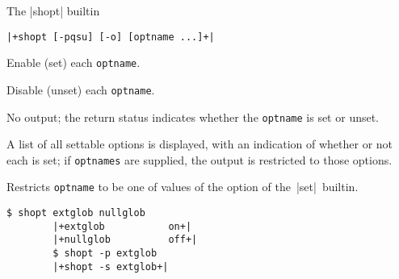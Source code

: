 \begin{frame}[fragile]{The \bash|shopt| builtin}{}
    \vspace{-2mm}
    \begin{lstlisting}[style=myBash, numbers=none]
        |+shopt [-pqsu] [-o] [optname ...]+|
    \end{lstlisting}
    \vspace{2mm}
    \begin{description}
        \item[\PB{\texttt{-s}}]
            Enable (set) each \texttt{optname}.
        \item[\PB{\texttt{-s}}]
            Disable (unset) each \texttt{optname}.
        \item[\PB{\texttt{-q}}]
            No output; the return status indicates whether the \texttt{optname} is set or unset.\\[-1mm]
        \item[\PB{\texttt{-p}}]
            A list of all settable options is displayed, with an indication of whether or not each is set; if \texttt{optnames} are supplied, the output is restricted to those options.\\[-1mm]
        \item[\PB{\texttt{-o}}]
            Restricts \texttt{optname} to be one of values of the  option of the \,\bash|set|\, builtin.
    \end{description}
    \begin{lstlisting}[style=myBash, aboveskip=2mm]
        $ shopt extglob nullglob
        |+extglob           on+|
        |+nullglob          off+|
        $ shopt -p extglob
        |+shopt -s extglob+|
    \end{lstlisting}
\end{frame}

